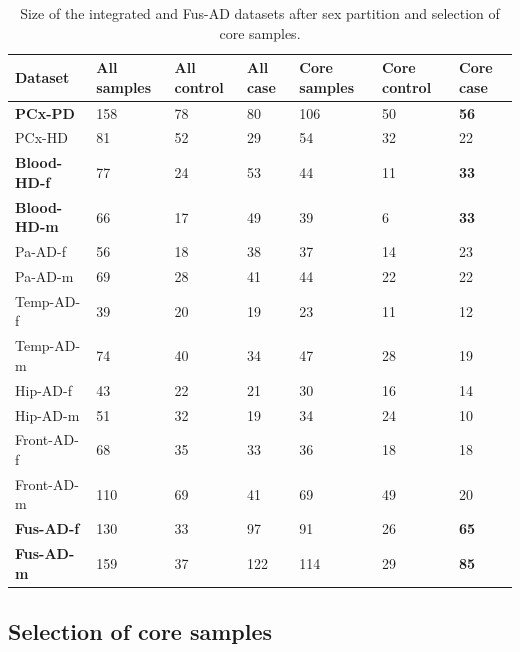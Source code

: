 \begin{table}[!ht]
\centering
\small
\caption{Size of the integrated and Fus-AD datasets after sex partition and selection of core samples.}
\label{tab:homosex-sets}
\begin{tabularx}{1.0\textwidth}{L{1.8cm}C{1.8cm}C{1.8cm}C{1.8cm}C{1.8cm}C{1.8cm}C{1.8cm}}
\toprule
Dataset & All samples & All control & All case & Core samples & Core control & Core case \\
  \midrule
\textbf{PCx-PD}     & 158 & 78 & 80  & 106 & 50 & \textbf{56} \\
PCx-HD     & 81  & 52 & 29  & 54  & 32 & 22 \\
\textbf{Blood-HD-f} & 77  & 24 & 53  & 44  & 11 & \textbf{33} \\
\textbf{Blood-HD-m} & 66  & 17 & 49  & 39  & 6  & \textbf{33} \\
Pa-AD-f    & 56  & 18 & 38  & 37  & 14 & 23 \\
Pa-AD-m    & 69  & 28 & 41  & 44  & 22 & 22 \\
Temp-AD-f  & 39  & 20 & 19  & 23  & 11 & 12 \\
Temp-AD-m  & 74  & 40 & 34  & 47  & 28 & 19 \\
Hip-AD-f   & 43  & 22 & 21  & 30  & 16 & 14 \\
Hip-AD-m   & 51  & 32 & 19  & 34  & 24 & 10 \\
Front-AD-f & 68  & 35 & 33  & 36  & 18 & 18 \\
Front-AD-m & 110 & 69 & 41  & 69  & 49 & 20 \\
\textbf{Fus-AD-f}   & 130 & 33 & 97  & 91  & 26 & \textbf{65} \\
\textbf{Fus-AD-m}   & 159 & 37 & 122 & 114 & 29 & \textbf{85} \\
\bottomrule

\end{tabularx}
\end{table}


\subsection{Selection of core samples}


